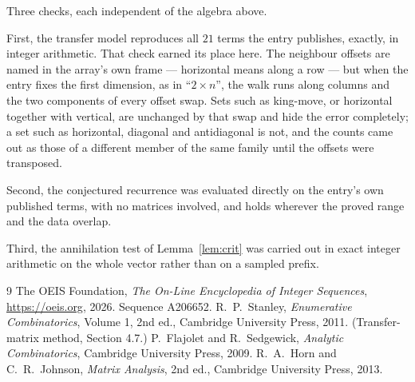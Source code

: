 \documentclass[11pt,a4paper]{article}
\theoremstyle{plain}
\theoremstyle{definition}
\begin{document}
Three checks, each independent of the algebra above.

First, the transfer model reproduces all $21$ terms the entry publishes, exactly, in
integer arithmetic. That check earned its place here. The neighbour offsets are named in the
array's own frame --- horizontal means along a row --- but when the entry fixes the first
dimension, as in ``$2\times n$'', the walk runs along columns and the two components of every
offset swap. Sets such as king-move, or horizontal together with vertical, are unchanged by
that swap and hide the error completely; a set such as horizontal, diagonal and antidiagonal
is not, and the counts came out as those of a different member of the same family until the
offsets were transposed.

Second, the conjectured recurrence was evaluated directly on the entry's own published terms,
with no matrices involved, and holds wherever the proved range and the data overlap.

Third, the annihilation test of Lemma~\ref{lem:crit} was carried out in exact integer
arithmetic on the whole vector rather than on a sampled prefix.

\begin{thebibliography}{9}
 The OEIS Foundation, \emph{The On-Line Encyclopedia of Integer
Sequences}, \url{https://oeis.org}, 2026. Sequence A206652.
 R.~P.~Stanley, \emph{Enumerative Combinatorics}, Volume 1, 2nd ed.,
Cambridge University Press, 2011. (Transfer-matrix method, Section 4.7.)
 P.~Flajolet and R.~Sedgewick, \emph{Analytic Combinatorics}, Cambridge
University Press, 2009.
 R.~A.~Horn and C.~R.~Johnson, \emph{Matrix Analysis}, 2nd ed., Cambridge
University Press, 2013.
\end{thebibliography}
\end{document}
